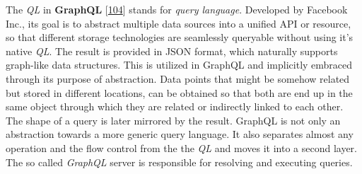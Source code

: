 \documentclass[12pt,english,a4paper,titlepage,cleardoublepage=empty,dottedtoc]{report}
\begin{document}
The \emph{QL} in \textbf{\protect\hypertarget{def--graphql}{}{GraphQL}}
{[}\protect\hyperlink{ref-web_spec_graphql}{104}{]} stands for
\emph{query language}. Developed by Facebook Inc., its goal is to
abstract multiple data sources into a unified API or resource, so that
different storage technologies are seamlessly queryable without using
it's native \emph{QL}. The result is provided in JSON format, which
naturally supports graph-like data structures. This is utilized in
GraphQL and implicitly embraced through its purpose of abstraction. Data
points that might be somehow related but stored in different locations,
can be obtained so that both are end up in the same object through which
they are related or indirectly linked to each other. The shape of a
query is later mirrored by the result. GraphQL is not only an
abstraction towards a more generic query language. It also separates
almost any operation and the flow control from the the \emph{QL} and
moves it into a second layer. The so called \emph{GraphQL} server is
responsible for resolving and executing queries.
\end{document}
